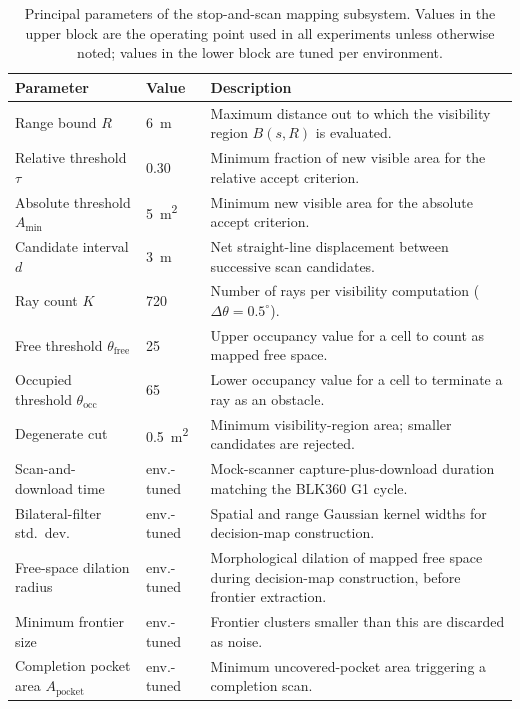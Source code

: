 \documentclass[sensors,article,submit,pdftex,moreauthors]{Definitions/mdpi}
\begin{document}
\begin{table}[H]
\caption{Principal parameters of the stop-and-scan mapping subsystem. Values in
the upper block are the operating point used in all experiments unless otherwise
noted; values in the lower block are tuned per environment.}
\label{tab:params}
\begin{tabularx}{\linewidth}{l l P}
\toprule
\textbf{Parameter} & \textbf{Value} & \textbf{Description} \\
\midrule
Range bound $R$              & 6~m   & Maximum distance out to which the visibility region $B(s,R)$ is evaluated. \\
Relative threshold $\tau$    & 0.30  & Minimum fraction of new visible area for the relative accept criterion. \\
Absolute threshold $A_{\min}$& 5~m\textsuperscript{2} & Minimum new visible area for the absolute accept criterion. \\
Candidate interval $d$       & 3~m   & Net straight-line displacement between successive scan candidates. \\
Ray count $K$                & 720   & Number of rays per visibility computation ($\Delta\theta=0.5^\circ$). \\
Free threshold $\theta_{\mathrm{free}}$ & 25 & Upper occupancy value for a cell to count as mapped free space. \\
Occupied threshold $\theta_{\mathrm{occ}}$ & 65 & Lower occupancy value for a cell to terminate a ray as an obstacle. \\
Degenerate cut               & 0.5~m\textsuperscript{2} & Minimum visibility-region area; smaller candidates are rejected. \\
\midrule
Scan-and-download time       & env.-tuned & Mock-scanner capture-plus-download duration matching the BLK360 G1 cycle. \\
Bilateral-filter std.\ dev.  & env.-tuned & Spatial and range Gaussian kernel widths for decision-map construction. \\
Free-space dilation radius   & env.-tuned & Morphological dilation of mapped free space during decision-map construction, before frontier extraction. \\
Minimum frontier size        & env.-tuned & Frontier clusters smaller than this are discarded as noise. \\
Completion pocket area $A_{\mathrm{pocket}}$ & env.-tuned & Minimum uncovered-pocket area triggering a completion scan. \\
\bottomrule
\end{tabularx}
\end{table}
\end{document}
